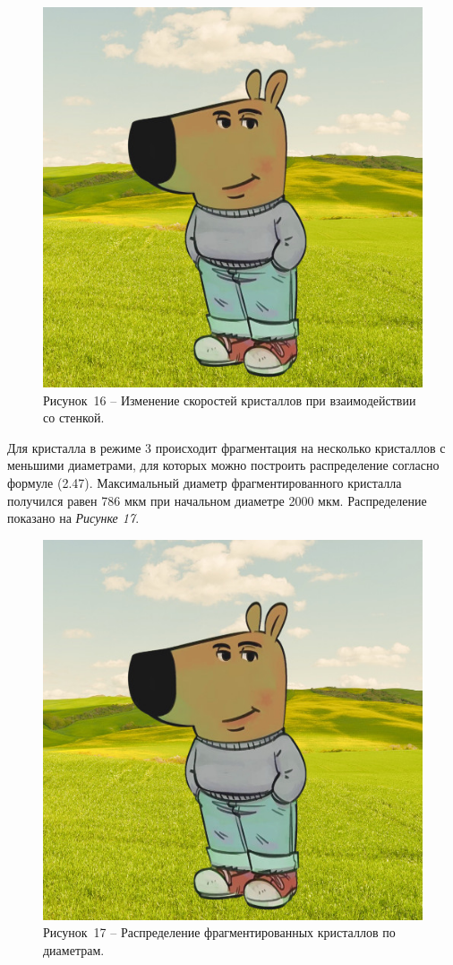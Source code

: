 \begin{figure}[H]
	\centering
	\includegraphics[width=\textwidth]{figures/chill-guy.jpeg}
	\caption*{Рисунок~16 – Изменение скоростей кристаллов при взаимодействии со стенкой.}
	\label{fig:-14}
\end{figure}

Для кристалла в режиме 3 происходит фрагментация на несколько кристаллов с меньшими диаметрами, для которых можно построить распределение согласно формуле (2.47). Максимальный диаметр фрагментированного кристалла получился равен 786 мкм при начальном диаметре 2000 мкм. Распределение показано на \textit{Рисунке 17}.

\begin{figure}[H]
	\centering
	\includegraphics[width=\textwidth]{figures/chill-guy.jpeg}
	\caption*{Рисунок~17 – Распределение фрагментированных кристаллов по диаметрам.}
	\label{fig:-15}
\end{figure} 
